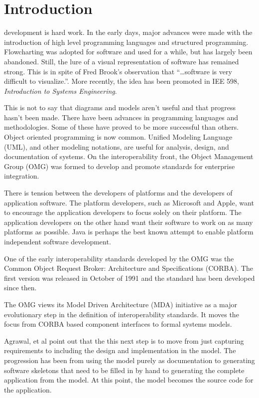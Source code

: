 \documentclass[10pt,journal,letterpaper,compsoc]{IEEEtran}
\begin{document}
\section{Introduction}
 development is hard work.  In the early days, major advances were made with the introduction of high level programming languages and structured programming.  Flowcharting was adopted for software and used for a while, but has largely been abandoned.  Still, the lure of a visual representation of software has remained strong.  This is in spite of Fred Brook's observation that ``\dots software is very difficult to visualize.''\cite{Brooks1995}.  More recently, the idea has been promoted in IEE 598, \emph{Introduction to Systems Engineering}\cite{Shunk2008}.

This is not to say that diagrams and models aren't useful and that progress hasn't been made.  There have been advances in programming languages and methodologies.  Some of these have proved to be more successful than others.  Object oriented programming is now common.  Unified Modeling Language (UML), and other modeling notations, are useful for analysis, design, and documentation of systems.  On the interoperability front, the Object Management Group (OMG) was formed to develop and promote standards for enterprise integration\cite{OMG2011}.

There is tension between the developers of platforms and the developers of application software.  The platform developers, such as Microsoft and Apple, want to encourage the application developers to focus solely on their platform.  The application developers on the other hand want their software to work on as many platforms as possible.  Java is perhaps the best known attempt to enable platform independent software development.

One of the early interoperability standards developed by the OMG was the Common Object Request Broker: Architecture and Specifications (CORBA)\cite{CORBA2011}.  The first version was released in October of 1991 and the standard has been developed since then.

The OMG views its Model Driven Architecture (MDA) initiative as a major evolutionary step in the definition of interoperability standards\cite{poole2001}.  It moves the focus from CORBA based component interfaces to formal systems models.

Agrawal, et al\cite{agrawal2002} point out that the this next step is to move from just capturing requirements to including the design and implementation in the model.  The progression has been from using the model purely as documentation to generating software skeletons that need to be filled in by hand to generating the complete application from the model.  At this point, the model becomes the source code for the application.
\end{document}
